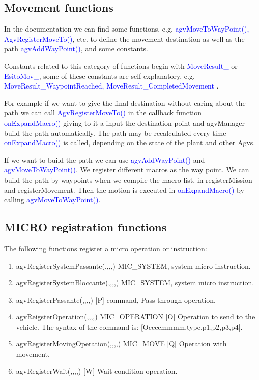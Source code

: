 %
\subsection{Movement functions}
In the documentation we can find some functions, e.g. \textcolor{blue}{agvMoveToWayPoint(), AgvRegisterMoveTo()}, etc. to define the movement destination as well as the path \textcolor{blue}{agvAddWayPoint()}, and some constants.

Constants related to this category of functions begin with \textcolor{blue}{MoveResult\_} or \textcolor{blue}{EsitoMov\_}, some of these constants are self-explanatory, e.g. \textcolor{blue}{MoveResult\_WaypointReached, MoveResult\_CompletedMovement }.

For example if we want to give the final destination without caring about the path we can call \textcolor{blue}{AgvRegisterMoveTo()} in the callback function \textcolor{blue}{onExpandMacro()} giving to it a input the destination point and agvManager build the path automatically. The path may be recalculated every time \textcolor{blue}{onExpandMacro()} is called, depending on the state of the plant and other Agvs.

If we want to build the path we can use \textcolor{blue}{agvAddWayPoint()} and \textcolor{blue}{agvMoveToWayPoint()}. We register different macros as the way point. We can build the path by waypoints when we compile the macro list, in registerMission and registerMovement. Then the motion is executed in \textcolor{blue}{onExpandMacro()} by calling \textcolor{blue}{agvMoveToWayPoint()}.

%
\subsection{MICRO registration functions}
The following functions register a micro operation or instruction:

\begin{enumerate}
	\item agvRegisterSystemPassante(,,,,) MIC\_SYSTEM, system micro instruction.
	\item agvRegisterSystemBloccante(,,,,) MIC\_SYSTEM, system micro instruction.\\
	
	\item agvRegisterPassante(,,,,) [P] command, Pass-through operation.
	\item agvReigsterOperation(,,,,) MIC\_OPERATION [O] Operation to send to the vehicle. The syntax of the command is: [Occccmmmm,type,p1,p2,p3,p4].
	\item agvRegisterMovingOperation(,,,,) MIC\_MOVE [Q] Operation with movement.\\
		
	\item agvRegisterWait(,,,,) [W] Wait condition operation.\\
	
\end{enumerate}

